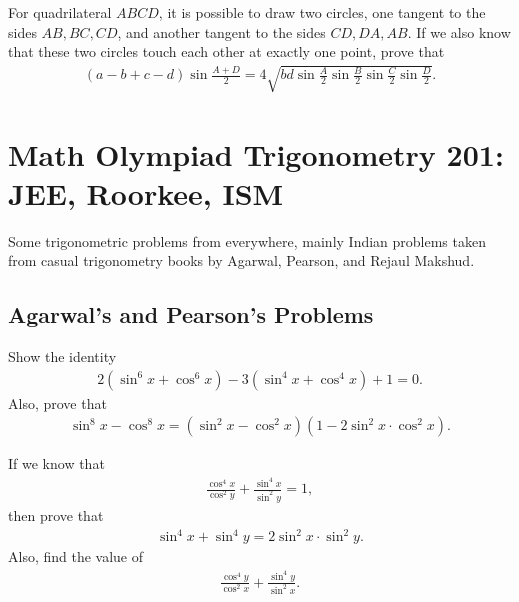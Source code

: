 \documentclass[12pt,a4paper]{memoir}
\theoremstyle{definition}
\begin{document}
\begin{question}
	For quadrilateral $ABCD$, it is possible to draw two circles, one tangent to the sides $AB,BC,CD$, and another tangent to the sides $CD, DA, AB$. If we also know that these two circles touch each other at exactly one point, prove that
	\begin{align*}
		(a-b+c-d)\sin\frac{A+D}{2} = 4 \sqrt{bd\sin\frac{A}{2}\sin\frac{B}{2}\sin\frac{C}{2}\sin\frac{D}{2}}.
	\end{align*}
\end{question}


\section{Math Olympiad Trigonometry 201:\\ JEE, Roorkee, ISM}
Some trigonometric problems from everywhere, mainly Indian problems taken from casual trigonometry books by Agarwal, Pearson, and Rejaul Makshud.

\subsection{Agarwal's and Pearson's Problems}

\begin{question}
	Show the identity
	\begin{align}
		2(\sin^6 x + \cos^6 x) - 3(\sin^4 x + \cos^4 x) + 1 =0. \label{id:sixfour}
	\end{align}
	Also, prove that
	\begin{align}
		\sin^8 x - \cos^8 x = (\sin^2 x - \cos^2 x)(1-2\sin^2 x \cdot \cos^2 x).\label{id:eight}
	\end{align}
\end{question}




\begin{question}
	If we know that
	\begin{align*}
		\frac{\cos^4 x}{\cos^2 y} + \frac{\sin^4 x}{\sin^2 y}=1,
	\end{align*}
	then prove that
	\begin{align}
		\sin^4 x + \sin^4 y = 2\sin^2 x \cdot \sin^2 y. \label{id:fourfour}
	\end{align}
	Also, find the value of
	\begin{align}
		\frac{\cos^4 y}{\cos^2 x} + \frac{\sin^4 y}{\sin^2 x}.\label{id:fourtwo-reciprocal}
	\end{align}
\end{question}
\end{document}
